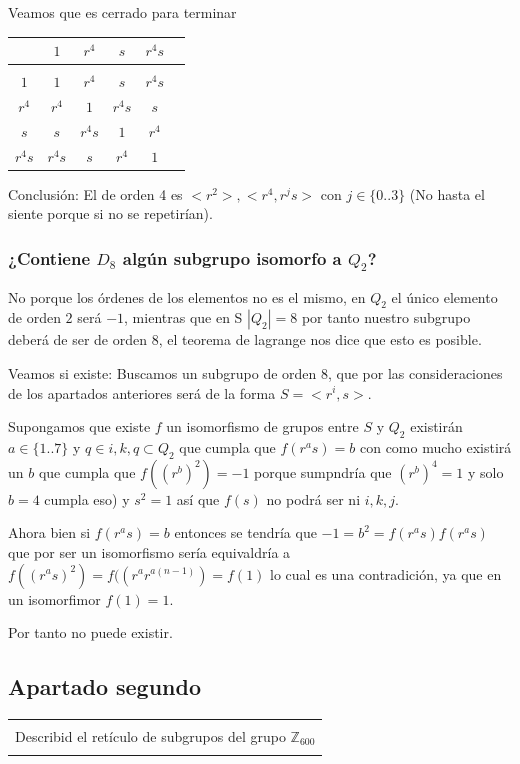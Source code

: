 \documentclass[12pt]{article}
\newenvironment{micaja}
{
    \begin{center}
    \begin{tabular}{|p{0.9\textwidth}|}
    \hline\\
    }   
    {   
    \\\\\hline
    \end{tabular} 
    \end{center}
    }
\begin{document}
Veamos que es cerrado para terminar 

\begin{tabular}{c|c c c c c}
     & $ 1            $ & $  r^4         $ & $  s     $ & $ r^4 s $\\ 
    \hline \\  
    $ 1    $ & $ 1             $ & $        r^4   $ & $ s      $ & $ r^4 s $\\ 
    $r^4   $ & $ r^4           $ & $1             $ & $ r^4 s  $ & $ s     $\\ 
    $s     $ & $ s             $ & $r^4 s $ & $    1   $ & $  r^4  $\\
    $r^4 s $ & $ r^4 s         $ & $ s            $ & $ r^4    $ & $ 1$

\end{tabular}


Conclusión: El de orden 4 es $<r^2>, <r^4,r^js>$ con $j \in \{0..3\}$ (No hasta el siente porque si no se repetirían).

\subsubsection*{¿Contiene $D_8$ algún subgrupo isomorfo a $Q_2$?}

No porque los órdenes de los elementos no es el mismo, en $Q_2$ el único elemento de orden $2$ 
será $-1$, mientras que en S
$|Q_2| = 8$ por tanto nuestro subgrupo deberá de ser de orden 8, el teorema de lagrange nos 
dice que esto es posible. 

Veamos si existe: 
Buscamos un subgrupo de orden 8, que por las consideraciones de los apartados anteriores
será de la forma $S = <r^i, s>$.

Supongamos que existe $f$ un isomorfismo de grupos entre $S$ y $Q_2$
existirán $a \in \{1..7\}$ y $ q \in {i,k,q} \subset Q_2$ que cumpla que $f(r^a s) = b$ 
con como mucho existirá un $b$ que cumpla que  $f((r^b)^2) = -1$ porque sumpndría que $(r^b)^4 = 1$ y solo $b=4$ cumpla eso) 
y $s^2 = 1$ así que $f(s)$ no podrá ser ni $i,k,j.$ 

Ahora bien si $f(r^a s) = b$ entonces se tendría que $-1 = b^2 = f(r^a s) f(r^a s)$ 
que por ser un isomorfismo sería equivaldría a $f((r^a s)^2) =f((r^a r^{a(n-1)}) = f(1)$
lo cual es una contradición, ya que en un isomorfimor $f(1)=1.$

Por tanto no puede existir.

\subsection{Apartado segundo}
\begin{micaja}
    Describid el retículo de subgrupos del grupo $\mathbb Z _{600}$
\end{micaja}
\end{document}
